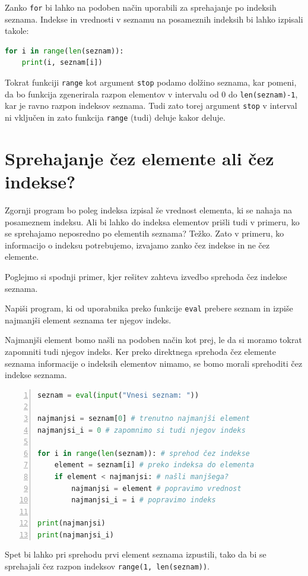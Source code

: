 Zanko \texttt{for} bi lahko na podoben način uporabili za sprehajanje po indeksih seznama. Indekse in vrednosti v seznamu na posameznih indeksih bi lahko izpisali takole:
\begin{lstlisting}[language=Python]
for i in range(len(seznam)):
    print(i, seznam[i])
\end{lstlisting}
Tokrat funkciji \texttt{range} kot argument \texttt{stop} podamo dolžino seznama, kar pomeni, da bo funkcija zgenerirala razpon elementov v intervalu od 0 do \texttt{len(seznam)-1}, kar je ravno razpon indeksov seznama. Tudi zato torej argument \texttt{stop} v interval ni vključen in zato funkcija \texttt{range} (tudi) deluje kakor deluje.

\section{Sprehajanje čez elemente ali čez indekse?}
Zgornji program bo poleg indeksa izpisal še vrednost elementa, ki se nahaja na posameznem indeksu. Ali bi lahko do indeksa elementov prišli tudi v primeru, ko se sprehajamo neposredno po elementih seznama? Težko. Zato v primeru, ko informacijo o indeksu potrebujemo, izvajamo zanko čez indekse in ne čez elemente.  

Poglejmo si spodnji primer, kjer rešitev zahteva izvedbo sprehoda čez indekse seznama.
\begin{zgled}
Napiši program, ki od uporabnika preko funkcije \texttt{eval} prebere seznam in izpiše najmanjši element seznama ter njegov indeks. 
\end{zgled}
\begin{resitev}
Najmanjši element bomo našli na podoben način kot prej, le da si moramo tokrat zapomniti tudi njegov indeks. Ker preko direktnega sprehoda čez elemente seznama informacije o indeksih elementov nimamo, se bomo morali sprehoditi čez indekse seznama.
\begin{lstlisting}[language=Python,numbers=left]
seznam = eval(input("Vnesi seznam: "))

najmanjsi = seznam[0] # trenutno najmanjši element
najmanjsi_i = 0 # zapomnimo si tudi njegov indeks

for i in range(len(seznam)): # sprehod čez indekse
    element = seznam[i] # preko indeksa do elementa
    if element < najmanjsi: # našli manjšega?
        najmanjsi = element # popravimo vrednost
        najmanjsi_i = i # popravimo indeks

print(najmanjsi)
print(najmanjsi_i)
\end{lstlisting}
Spet bi lahko pri sprehodu prvi element seznama izpustili, tako da bi se sprehajali čez razpon indeksov \texttt{range(1, len(seznam))}.
\end{resitev}

